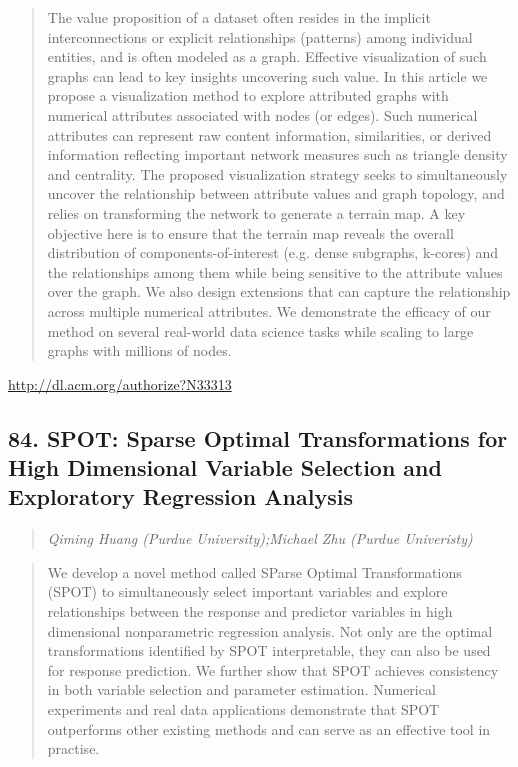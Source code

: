 \documentclass{article}
\begin{document}
\begin{quote}
The value proposition of a dataset often resides in the implicit interconnections or explicit relationships (patterns) among individual entities, and is often modeled as a graph. Effective visualization of such graphs can lead to key insights uncovering such value. In this article we propose a visualization method to explore attributed graphs with numerical attributes associated with nodes (or edges). Such numerical attributes can represent raw content information, similarities, or derived information reflecting important network measures such as triangle density and centrality. The proposed visualization strategy seeks to simultaneously uncover the relationship between attribute values and graph topology, and relies on transforming the network to generate a terrain map. A key objective here is to ensure that the terrain map reveals the overall distribution of components-of-interest (e.g. dense subgraphs, k-cores) and the relationships among them while being sensitive to the attribute values over the graph. We also design extensions that can capture the relationship across multiple numerical attributes. We demonstrate the efficacy of our method on several real-world data science tasks while scaling to large graphs with millions of nodes.
\end{quote}

\href{http://dl.acm.org/authorize?N33313}{http://dl.acm.org/authorize?N33313}

\subsection{84. SPOT: Sparse Optimal Transformations for High Dimensional Variable Selection and Exploratory Regression Analysis}

\begin{quote}
\footnotesize{\textit{Qiming Huang (Purdue University);Michael Zhu (Purdue Univeristy)}}

\end{quote}

\begin{quote}
We develop a novel method called SParse Optimal Transformations (SPOT) to simultaneously select important variables and explore relationships between the response and predictor variables in high dimensional nonparametric regression analysis. Not only are the optimal transformations identified by SPOT interpretable, they can also be used for response prediction. We further show that SPOT achieves consistency in both variable selection and parameter estimation. Numerical experiments and real data applications demonstrate that SPOT outperforms other existing methods and can serve as an effective tool in practise.
\end{quote}
\end{document}
